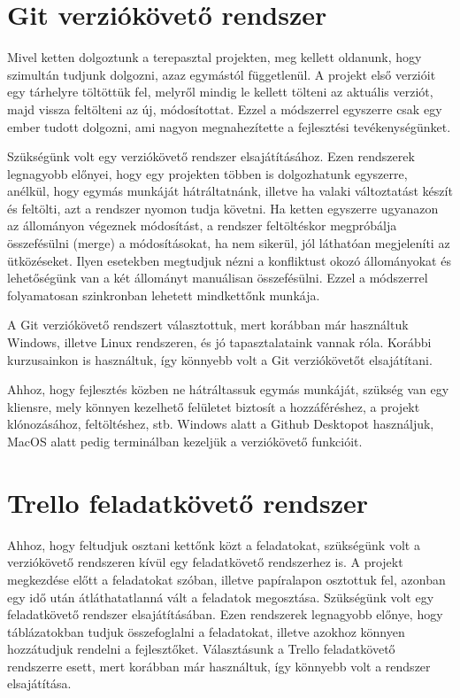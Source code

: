 \documentclass[
]{thesis-ekf}
\theoremstyle{definition}
\theoremstyle{remark}
\begin{document}
	\section{Git verziókövető rendszer}
	Mivel ketten dolgoztunk a terepasztal projekten, meg kellett oldanunk, hogy szimultán tudjunk dolgozni, azaz egymástól függetlenül. A projekt első verzióit egy tárhelyre töltöttük fel, melyről mindig le kellett tölteni az aktuális verziót, majd vissza feltölteni az új, módosítottat. Ezzel a módszerrel egyszerre csak egy ember tudott dolgozni, ami nagyon megnahezítette a fejlesztési tevékenységünket.
	\par Szükségünk volt egy verziókövető rendszer elsajátításához. Ezen rendszerek legnagyobb előnyei, hogy egy projekten többen is dolgozhatunk egyszerre, anélkül, hogy egymás munkáját hátráltatnánk, illetve ha valaki változtatást készít és feltölti, azt a rendszer nyomon tudja követni. Ha ketten egyszerre ugyanazon az állományon végeznek módosítást, a rendszer feltöltéskor megpróbálja összefésülni (merge) a módosításokat, ha nem sikerül, jól láthatóan megjeleníti az ütközéseket. Ilyen esetekben megtudjuk nézni a konfliktust okozó állományokat és lehetőségünk van a két állományt manuálisan összefésülni. Ezzel a módszerrel folyamatosan szinkronban lehetett mindkettőnk munkája.
	\par A Git verziókövető rendszert választottuk, mert korábban már használtuk Windows, illetve Linux rendszeren, és jó tapasztalataink vannak róla. Korábbi kurzusainkon is használtuk, így könnyebb volt a Git verziókövetőt elsajátítani. 
	\par Ahhoz, hogy fejlesztés közben ne hátráltassuk egymás munkáját, szükség van egy kliensre, mely könnyen kezelhető felületet biztosít a hozzáféréshez, a projekt klónozásához, feltöltéshez, stb. Windows alatt a Github Desktopot használjuk, MacOS alatt pedig terminálban kezeljük a verziókövető funkcióit.
	\section{Trello feladatkövető rendszer}
	\par Ahhoz, hogy feltudjuk osztani kettőnk közt a feladatokat, szükségünk volt a verziókövető rendszeren kívül egy feladatkövető rendszerhez is. A projekt megkezdése előtt a feladatokat szóban, illetve papíralapon osztottuk fel, azonban egy idő után átláthatatlanná vált a feladatok megosztása. Szükségünk volt egy feladatkövető rendszer elsajátításában. Ezen rendszerek legnagyobb előnye, hogy táblázatokban tudjuk összefoglalni a feladatokat, illetve azokhoz könnyen hozzátudjuk rendelni a fejlesztőket. Választásunk a Trello feladatkövető rendszerre esett, mert korábban már használtuk, így könnyebb volt a rendszer elsajátítása. 
	
\end{document}
